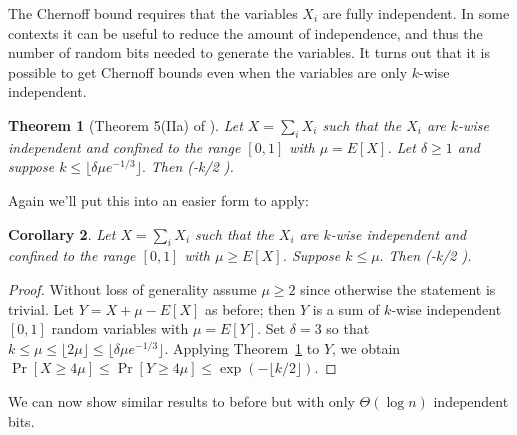 \documentclass[11pt,a4paper]{article}
\newtheorem{theorem}{Theorem}
\newtheorem{corollary}[theorem]{Corollary}
\def\[#1\]{\begin{align*}#1\end{align*}}
\begin{document}
The Chernoff bound requires that the variables \(X_i\) are fully independent.
In some contexts it can be useful to reduce the amount of independence, and thus the number of random bits needed to generate the variables.
It turns out that it is possible to get Chernoff bounds even when the variables are only \(k\)-wise independent.

\begin{theorem}[Theorem 5(IIa) of \cite{limited-chernoff}]
  \label{thm:limited-chernoff}
  Let \(X = \sum_i X_i\) such that the \(X_i\) are \(k\)-wise independent and confined to the range \([0, 1]\) with \(\mu = E[X]\).
  Let \(\delta \ge 1\) and suppose \(k \le \lfloor \delta \mu e^{-1/3} \rfloor.\)
  Then \[\Pr[X \ge (1 + \delta)\mu] \le \exp(-\lfloor k/2 \rfloor).\]
\end{theorem}

Again we'll put this into an easier form to apply:

\begin{tcolorbox}
  \begin{corollary}
    \label{cor:limited-chernoff-simple}
    Let \(X = \sum_i X_i\) such that the \(X_i\) are \(k\)-wise independent and confined to the range \([0, 1]\) with \(\mu \ge E[X]\).
    Suppose \(k \le \mu.\)
    Then \[\Pr[X \ge 4\mu] \le \exp(-\lfloor k/2 \rfloor).\]
  \end{corollary}
\end{tcolorbox}
\begin{proof}
  Without loss of generality assume \(\mu \ge 2\) since otherwise the statement is trivial.
  Let \(Y = X + \mu - E[X]\) as before; then \(Y\) is a sum of \(k\)-wise independent \([0, 1]\) random variables with \(\mu = E[Y]\).
  Set \(\delta = 3\) so that \(k \le \mu \le \lfloor 2\mu \rfloor \le \lfloor \delta \mu e^{-1/3} \rfloor\).
  Applying Theorem~\ref{thm:limited-chernoff} to \(Y\), we obtain
  \(\Pr[X \ge 4\mu] \le \Pr[Y \ge 4\mu] \le \exp(-\lfloor k/2 \rfloor).\)
\end{proof}

We can now show similar results to before but with only \(\Theta(\log n)\) independent bits.
\end{document}
